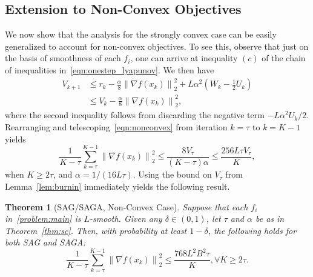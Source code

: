 \documentclass{article}
\theoremstyle{plain}
\newtheorem{theorem}{Theorem}[section]
\theoremstyle{definition}
\newcommand{\norm}[1]{\left\| #1\right\|_{2}}
\newcommand{\paren}[1]{\left( #1\right)}
\begin{document}


\subsection{Extension to Non-Convex Objectives}\label{sec:nonconvex}
We now show that the analysis for the strongly convex case can be easily generalized to account for non-convex objectives. To see this, observe that just on the basis of smoothness of each $f_i$, one can arrive at inequality $(c)$ of the chain of inequalities in~\eqref{eqn:onestep_lyapunov}. We then have
\begin{equation}
\begin{aligned}
    V_{k+1}&\leq r_k-\frac{\alpha}{8}\norm{\nabla f(x_k)}^2 + L\alpha^2\paren{W_k-\frac{1}{2}U_k}\\
    &\leq V_k-\frac{\alpha}{8}\norm{\nabla f(x_k)}^2,\label{eqn:nonconvex}
\end{aligned}
\end{equation}
where the second inequality follows from discarding the negative term $-L\alpha^2U_k/2$. Rearranging and telescoping~\eqref{eqn:nonconvex} from iteration $k=\tau$ to $k=K-1$ yields
\begin{equation}
    \frac{1}{K-\tau}\sum_{k=\tau}^{K-1}\norm{\nabla f(x_k)}^2\leq\frac{8 V_\tau}{(K-\tau)\alpha} \leq \frac{256 L \tau V_\tau}{K},
\end{equation}
when $K \geq 2 \tau$, and $\alpha = 1/(16 L \tau).$ Using the bound on $V_{\tau}$ from Lemma~\ref{lem:burnin} immediately yields the following result. 

\begin{theorem}[SAG/SAGA, Non-Convex Case]\label{thm:nonconvex}
Suppose that each $f_i$ in~\eqref{problem:main} is $L$-smooth. Given any $\delta \in (0,1)$, let $\tau$ and $\alpha$ be as in Theorem~\ref{thm:sc}. Then, with probability at least $1-\delta$, the following holds for both SAG and SAGA: 
\begin{equation}
    \frac{1}{K-\tau}\sum_{k=\tau}^{K-1}\norm{\nabla f(x_k)}^2\leq\frac{768 L^2B^2 \tau}{K}, \forall K \geq 2\tau. \label{eqn:nonconvex_thm}
\end{equation}
\end{theorem}
\end{document}
